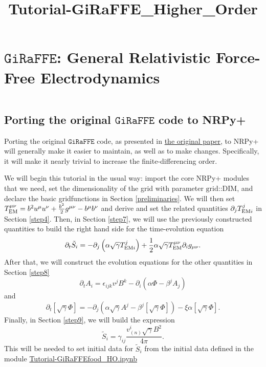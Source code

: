 \documentclass[landscape,letterpaper,10pt,english]{article}
\title{Tutorial-GiRaFFE\_Higher\_Order}
\begin{document}
    
    
    \maketitle
    
    

    
    \section{\texorpdfstring{\(\texttt{GiRaFFE}\): General Relativistic
Force-Free
Electrodynamics}{\textbackslash{}texttt\{GiRaFFE\}: General Relativistic Force-Free Electrodynamics}}\label{textttgiraffe-general-relativistic-force-free-electrodynamics}

\[\label{top}\]

\subsection{\texorpdfstring{Porting the original \(\texttt{GiRaFFE}\)
code to
NRPy+}{Porting the original \textbackslash{}texttt\{GiRaFFE\} code to NRPy+}}\label{porting-the-original-textttgiraffe-code-to-nrpy}

Porting the original \(\texttt{GiRaFFE}\) code, as presented in
\href{https://arxiv.org/pdf/1704.00599.pdf}{the original paper}, to
NRPy+ will generally make it easier to maintain, as well as to make
changes. Specifically, it will make it nearly trivial to increase the
finite-differencing order.

We will begin this tutorial in the usual way: import the core NRPy+
modules that we need, set the dimensionality of the grid with parameter
\(\text{grid::DIM}\), and declare the basic gridfunctions in
Section \ref{preliminaries}. We will then set
\(T^{\mu \nu}_{\rm EM} = b^2 u^{\mu} u^{\nu} + \frac{b^2}{2} g^{\mu \nu} - b^{\mu} b^{\nu}\)
and derive and set the related quantities
\(\partial_j T^{j}_{{\rm EM} i}\) in Section \ref{step4}. Then, in
Section \ref{step7}, we will use the previously constructed quantities
to build the right hand side for the time-evolution equation
\[\partial_t \tilde{S}_i = - \partial_j \left( \alpha \sqrt{\gamma} T^j_{{\rm EM} i} \right) + \frac{1}{2} \alpha \sqrt{\gamma} T^{\mu \nu}_{\rm EM} \partial_i g_{\mu \nu}.\]
After that, we will construct the evolution equations for the other
quantities in Section \ref{step8}
\[\partial_t A_i = \epsilon_{ijk} v^j B^k - \partial_i (\alpha \Phi - \beta^j A_j)\]
and
\[\partial_t [\sqrt{\gamma} \Phi] = -\partial_j (\alpha\sqrt{\gamma}A^j - \beta^j [\sqrt{\gamma} \Phi]) - \xi \alpha [\sqrt{\gamma} \Phi].\]
Finally, in Section \ref{step9}, we will build the expression
\[\tilde{S}_i = \gamma_{ij} \frac{v^i_{(n)} \sqrt{\gamma}B^2}{4 \pi}.\]
This will be needed to set initial data for \(\tilde{S}_i\) from the
initial data defined in the module \url{Tutorial-GiRaFFEfood_HO.ipynb}
\end{document}
